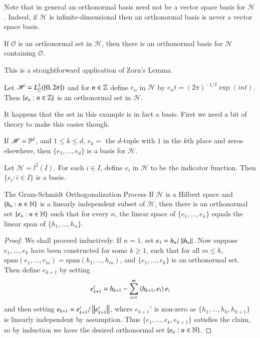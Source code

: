 Note that in general an orthonormal basis need not be a vector space basis for $\mathscr{H}$. Indeed, if $\mathscr{H}$ is infinite-dimensional then an orthonormal basis is never a vector space basis.

\begin{prop}
    If $\mathscr{O}$ is an orthonormal set in $\mathscr{H}$, then there is an orthonormal basis for $\mathscr{H}$ containing $\mathscr{O}$.
\end{prop}

This is a straightforward application of Zorn's Lemma.

\begin{eg}
    Let $\mathscr{H} = L^2_{\mathbb C}([0,2\pi])$ and for $n \in \mathbb Z$ define $e_n$ in $\mathscr{H}$ by $e_nt = (2\pi)^{-1/2}\exp(int)$. Then $\{e_n:n\in\mathbb Z\}$ is an orthonormal set in $\mathscr{H}$.
\end{eg}

It happens that the set in this example is in fact a basis. First we need a bit of theory to make this easier though.

\begin{eg}
    If $\mathscr{H} = \mathbb F^d$, and $1 \leq k \leq d$, $e_k =$ the $d$-tuple with $1$ in the $k$th place and zeros elsewhere, then $\{e_1,...,e_d\}$ is a basis for $\mathscr{H}$.
\end{eg}

\begin{eg}
    Let $\mathscr{H} = l^2(I)$. For each $i \in I$, define $e_i$ in $\mathscr{H}$ to be the indicator function. Then $\{e_i:i \in I\}$ is a basis.
\end{eg}

\begin{nthm}{The Gram-Schmidt Orthogonalization Process}
    If $\mathscr{H}$ is a Hilbert space and $\{h_n:n \in \mathbb N\}$ is a linearly independent subset of $\mathscr{H}$, then there is an orthonormal set $\{e_n:n \in \mathbb N\}$ such that for every $n$, the linear space of $\{e_1,...,e_n\}$ equals the linear span of $\{h_1,...,h_n\}$.
\end{nthm}
\begin{proof}
    We shall proceed inductively. If $n=1$, set $e_1 = h_n/\left|\left| h_n\right|\right|$. Now suppose $e_1,...,e_k$ have been constructed for some $k \geq 1$, such that for all $m \leq k$, $\text{span}(e_1,...,e_m) = \text{span}(h_1,...,h_m)$, and $\{e_1,...,e_k\}$ is an orthonormal set. Then define $e_{k+1}$ by setting $$e_{k+1}' = h_{k+1} - \sum_{i=1}^m\left\langle h_{k+1}, e_i\right\rangle e_i$$
    and then setting $e_{k+1} = e_{k+1}'/\left|\left| e_{k+1}'\right|\right|$, where $e_{k+1}'$ is non-zero as $\{h_1,...,h_k,h_{k+1}\}$ is linearly independent by assumption. Thus $\{e_1,...,e_k,e_{k+1}\}$ satisfies the claim, so by induction we have the desired orthonormal set $\{e_n:n \in \mathbb N\}$.
\end{proof}

